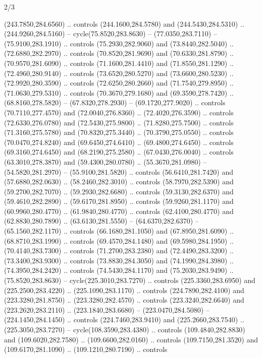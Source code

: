 \begin{flagdescription}{2/3}
\begin{scope}[xshift=0.5\flaglength,yshift=0.5\flagwidth,scale=\stretchfactor]
\begin{scope}[scale=0.001645\flagwidth,yshift=65mm,xshift=-63mm]
\begin{scope}[y=0.80pt, x=0.80pt, yscale=-1,]
\begin{scope}[cm={{1.33333,0.0,0.0,1.33333,(0.0,1e-05)}}]
  (243.7850,284.6560) .. controls (244.1600,284.5780) and (244.5430,284.5310) ..
  (244.9260,284.5160) -- cycle(75.8520,283.8630) -- (77.0350,283.7110) --
  (75.9100,283.1910) .. controls (75.2930,282.9060) and (73.8440,282.5040) ..
  (72.6880,282.2970) .. controls (70.8520,281.9690) and (70.6330,281.8790) ..
  (70.9570,281.6090) .. controls (71.1600,281.4410) and (71.8550,281.1290) ..
  (72.4960,280.9140) .. controls (73.6520,280.5270) and (73.6600,280.5230) ..
  (72.9920,280.3590) .. controls (72.6250,280.2660) and (71.7540,279.8950) ..
  (71.0630,279.5310) .. controls (70.3670,279.1680) and (69.3590,278.7420) ..
  (68.8160,278.5820) -- (67.8320,278.2930) -- (69.1720,277.9020) .. controls
  (70.7110,277.4570) and (72.0040,276.8360) .. (72.4020,276.3590) .. controls
  (72.6330,276.0780) and (72.5430,275.9800) .. (71.8280,275.7500) .. controls
  (71.3160,275.5780) and (70.8320,275.3440) .. (70.3790,275.0550) .. controls
  (70.0470,274.8240) and (69.6450,274.6410) .. (69.4800,274.6450) .. controls
  (69.3160,274.6450) and (68.2190,275.2580) .. (67.0430,276.0040) .. controls
  (63.3010,278.3870) and (59.4300,280.0780) .. (55.3670,281.0980) --
  (54.5820,281.2970) -- (55.9100,281.5820) .. controls (56.6410,281.7420) and
  (57.6880,282.0630) .. (58.2460,282.3010) .. controls (58.7970,282.5390) and
  (59.2700,282.7070) .. (59.2930,282.6680) .. controls (59.3130,282.6370) and
  (59.4610,282.2890) .. (59.6170,281.8950) .. controls (59.9260,281.1170) and
  (60.9960,280.4770) .. (61.9840,280.4770) .. controls (62.4100,280.4770) and
  (62.8830,280.7890) .. (63.6130,281.5550) -- (64.6370,282.6370) --
  (65.1560,282.1170) .. controls (66.1680,281.1050) and (67.8950,281.6090) ..
  (68.8710,283.1990) .. controls (69.4570,284.1480) and (69.5980,284.1950) ..
  (70.4140,283.7300) .. controls (71.2700,283.2380) and (72.4490,283.3200) ..
  (73.3400,283.9300) .. controls (73.8830,284.3050) and (74.1990,284.3980) ..
  (74.3950,284.2420) .. controls (74.5430,284.1170) and (75.2030,283.9490) ..
  (75.8520,283.8630) -- cycle(225.3010,283.7270) .. controls (225.3360,283.6950)
  and (225.2500,283.4220) .. (225.1090,283.1170) .. controls (224.7890,282.4100)
  and (223.3280,281.8750) .. (223.3280,282.4570) .. controls (223.3240,282.6640)
  and (223.2620,283.2110) .. (223.1840,283.6680) -- (223.0470,284.5080) --
  (224.1450,284.1450) .. controls (224.7460,283.9410) and (225.2660,283.7540) ..
  (225.3050,283.7270) -- cycle(108.3590,283.4380) .. controls
  (109.4840,282.8830) and (109.6020,282.7580) .. (109.6600,282.0160) .. controls
  (109.7150,281.3520) and (109.6170,281.1090) .. (109.1210,280.7190) .. controls

\end{scope}
\end{scope}
\end{scope}
\end{scope}
\end{flagdescription}
